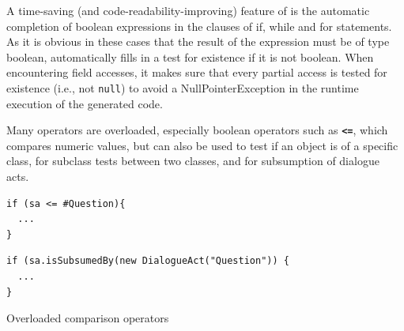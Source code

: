 
A time-saving (and code-readability-improving) feature of \vonda is the automatic completion of boolean expressions in the clauses of if, while and for statements. As it is obvious in these cases that the result of the expression must be of type boolean, \vonda automatically fills in a test for existence if it is not boolean. When encountering field accesses, it makes sure that every partial access is tested for existence (i.e., not \texttt{null}) to avoid a NullPointerException in the runtime execution of the generated code.


Many operators are overloaded, especially boolean operators such as
\textbf{\texttt{<=}}, which compares numeric values, but can also be used to test if an
object is of a specific class, for subclass tests between two classes, and for
subsumption of dialogue acts.

\begin{table}[htbp]
  \centering
  \begin{footnotesize}
    \begin{minipage}{0.3\textwidth}
\begin{verbatim}
if (sa <= #Question){
  ...
}
\end{verbatim}
    \end{minipage}
    \begin{minipage}{0.5\textwidth}
\begin{verbatim}
if (sa.isSubsumedBy(new DialogueAct("Question")) {
  ...
}
\end{verbatim}
    \end{minipage}
  \end{footnotesize}

  \caption{Overloaded comparison operators}
  \label{tab:overloaded-comparison}
\end{table}

